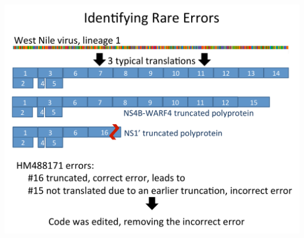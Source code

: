\documentclass[landscape]{slides}
\begin{document}
\begin{slide}
\begin{center}
\includegraphics[height=8in]{figs/eneida-slide-3}
\vfill
\end{center}
\end{slide}
\end{document}
